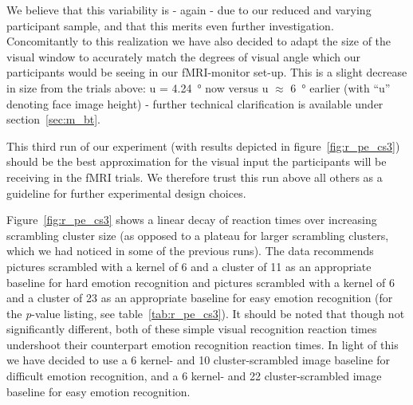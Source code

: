 	    We believe that this variability is - again - due to our reduced and varying participant sample, and that this merits even further investigation.
	    Concomitantly to this realization we have also decided to adapt the size of the visual window to accurately match the degrees of visual angle which our participants would be seeing in our fMRI-monitor set-up. This is a slight decrease in size from the trials above: u = \SI{4.24}{\degree} now versus u $\approx$ \SI{6}{\degree} earlier (with “u” denoting face image height) -
	    further technical clarification is available under section~\ref{sec:m_bt}.
	    
	    This third run of our experiment (with results depicted in figure~\ref{fig:r_pe_cs3}) should be the best approximation for the visual input the participants will be receiving in the fMRI trials.
	    We therefore trust this run above all others as a guideline for further experimental design choices.
	    
	    Figure~\ref{fig:r_pe_cs3} shows a linear decay of reaction times over increasing scrambling cluster size
	    (as opposed to a plateau for larger scrambling clusters, which we had noticed in some of the previous runs).
	    The data recommends pictures scrambled with a kernel of \SI{6}{\pixel} and a cluster of \SI{11}{\pixel} as an appropriate baseline for hard emotion recognition
	    and pictures scrambled with a kernel of \SI{6}{\pixel} and a cluster of \SI{23}{\pixel} as an appropriate baseline for easy emotion recognition
	    (for the \textit{p}-value listing, see table~\ref{tab:r_pe_cs3}).
	    It should be noted that though not significantly different, both of these simple visual recognition reaction times undershoot their counterpart emotion recognition reaction times.
	    In light of this we have decided to use a \SI{6}{\pixel} kernel- and \SI{10}{\pixel} cluster-scrambled image baseline for difficult emotion recognition, 
	    and a \SI{6}{\pixel} kernel- and \SI{22}{\pixel} cluster-scrambled image baseline for easy emotion recognition.
	    
